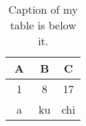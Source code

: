 \begin{table}[htbp]
\centering
\begin{tabular}{||c c c||}
\hline
A & B & C \\ [0.5ex]
\hline
1 & 8 & 17 \\
\hline
a　& ku & chi \\
\hline
\end{tabular}
\label{tab:tsabela}
\caption{Caption of my table is below it.}
\end{table}